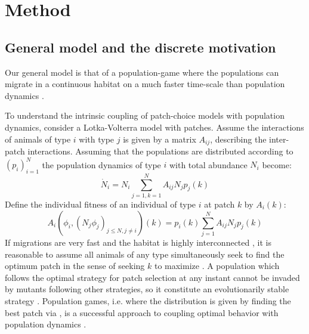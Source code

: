 \section{Method}


\subsection{General model and the discrete motivation}
\label{sec:gen_model}
Our general model is that of a population-game \citep{kvrivan2009evolutionary} where the populations can migrate in a continuous habitat on a much faster time-scale than population dynamics \citep{cressman2006migration, abrams2007role}. %

To understand the intrinsic coupling of patch-choice models with population dynamics,
consider a Lotka-Volterra model with patches. Assume the interactions of animals of type $i$ with type $j$ is given by a matrix $A_{ij}$, describing the inter-patch interactions. Assuming that the populations are distributed according to $(p_i)_{i=1}^N$ the population dynamics of type $i$ with total abundance $N_i$ become:
  \begin{equation}
  \dot{N}_i = N_i\sum_{j=1,k=1}^N {A_{ij}N_j p_j}(k) %
  \label{eq:pop_dyn_lv}
\end{equation}
Define the individual fitness
of an individual of type $i$ at patch $k$ by $A_i(k)$:
\begin{equation}
  A_i(\phi_i, (N_j \phi_j)_{j \leq N, j \neq i})(k) = p_i(k) \sum_{j=1}^N {A_{ij}N_j p_j}(k) %
  \label{eq:utility_pm}
\end{equation}
If migrations are very fast and the habitat is highly interconnected \citep{abrams2007role, cressman2006migration}, it is reasonable to assume all animals of any type simultaneously seek to find the optimum patch in the sense of seeking $k$ to maximize . A population which follows the optimal strategy for patch selection at any instant cannot be invaded by mutants following other strategies, so it constitute an evolutionarily stable strategy \citep{kvrivan2009evolutionary}. Population games, i.e.  where the distribution is given by finding the best patch via , is a successful approach to coupling optimal behavior with population dynamics \citep{kvrivan2008ideal,morris2020time,mougi2019adaptive}.

